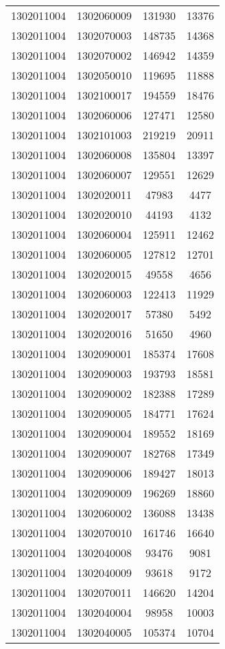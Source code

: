 \begin{longtable}{llcc}
1302011004 & 1302060009 & 131930 & 13376\\
1302011004 & 1302070003 & 148735 & 14368\\
1302011004 & 1302070002 & 146942 & 14359\\
1302011004 & 1302050010 & 119695 & 11888\\
1302011004 & 1302100017 & 194559 & 18476\\
1302011004 & 1302060006 & 127471 & 12580\\
1302011004 & 1302101003 & 219219 & 20911\\
1302011004 & 1302060008 & 135804 & 13397\\
1302011004 & 1302060007 & 129551 & 12629\\
1302011004 & 1302020011 & 47983 & 4477\\
1302011004 & 1302020010 & 44193 & 4132\\
1302011004 & 1302060004 & 125911 & 12462\\
1302011004 & 1302060005 & 127812 & 12701\\
1302011004 & 1302020015 & 49558 & 4656\\
1302011004 & 1302060003 & 122413 & 11929\\
1302011004 & 1302020017 & 57380 & 5492\\
1302011004 & 1302020016 & 51650 & 4960\\
1302011004 & 1302090001 & 185374 & 17608\\
1302011004 & 1302090003 & 193793 & 18581\\
1302011004 & 1302090002 & 182388 & 17289\\
1302011004 & 1302090005 & 184771 & 17624\\
1302011004 & 1302090004 & 189552 & 18169\\
1302011004 & 1302090007 & 182768 & 17349\\
1302011004 & 1302090006 & 189427 & 18013\\
1302011004 & 1302090009 & 196269 & 18860\\
1302011004 & 1302060002 & 136088 & 13438\\
1302011004 & 1302070010 & 161746 & 16640\\
1302011004 & 1302040008 & 93476 & 9081\\
1302011004 & 1302040009 & 93618 & 9172\\
1302011004 & 1302070011 & 146620 & 14204\\
1302011004 & 1302040004 & 98958 & 10003\\
1302011004 & 1302040005 & 105374 & 10704\\

\end{longtable}
